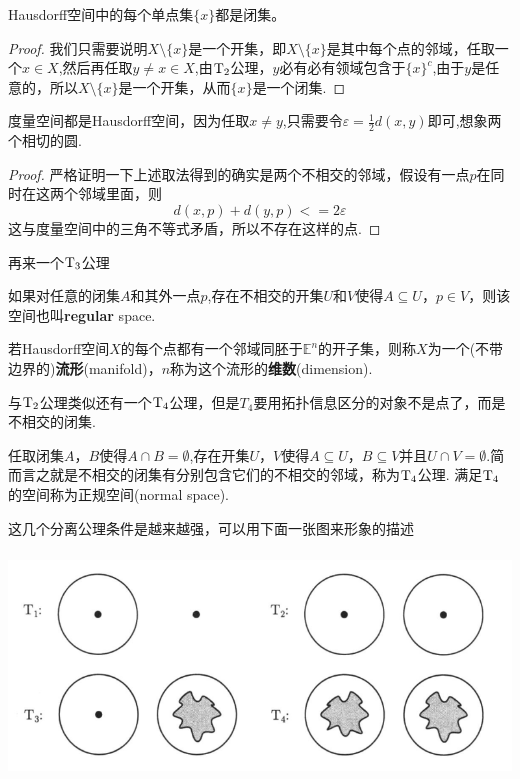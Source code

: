 \begin{proposition}
\rm Hausdorff空间中的每个单点集$\{x\}$都是闭集。
\end{proposition}

\begin{proof}
我们只需要说明$X \setminus \{x\}$是一个开集，即$X \setminus \{x\}$是其中每个点的邻域，任取一个$x \in X$,然后再任取$y \neq x \in X$,由$\rm T_2$公理，$y$必有必有领域包含于$\{x\}^c$,由于$y$是任意的，所以$X \setminus \{x\}$是一个开集，从而$\{x\}$是一个闭集.
\end{proof}

\begin{example}
度量空间都是\rm Hausdorff空间，因为任取$x \neq y$,只需要令$\varepsilon = \frac{1}{2}d(x,y)$即可,想象两个相切的圆.
\end{example}

\begin{proof}
严格证明一下上述取法得到的确实是两个不相交的邻域，假设有一点$p$在同时在这两个邻域里面，则\[d(x,p) + d(y,p) <= 2\varepsilon\]这与度量空间中的三角不等式矛盾，所以不存在这样的点.
\end{proof}

再来一个$\rm T_3$公理

\begin{definition}
如果对任意的闭集$A$和其外一点$p$,存在不相交的开集$U$和$V$使得$A \subseteq U$，$p \in V$，则该空间也叫\rm \textbf{regular} space.
\end{definition}

\begin{definition}
若\rm Hausdorff空间$X$的每个点都有一个邻域同胚于$\mathbb{E}^n$的开子集，则称$X$为一个(不带边界的)\textbf{流形}(manifold)，$n$称为这个流形的\textbf{维数}(\rm dimension).
\end{definition}


与$\rm T_2$公理类似还有一个$\rm T_4$公理，但是$T_4$要用拓扑信息区分的对象不是点了，而是不相交的闭集.

\begin{definition}
任取闭集$A$，$B$使得$A \cap B = \emptyset$,存在开集$U$，$V$使得$A \subseteq U$，$B \subseteq V$并且$U \cap V = \emptyset$.简而言之就是不相交的闭集有分别包含它们的不相交的邻域，称为$\rm T_4$公理. 满足$\rm T_4$的空间称为\textsf{正规空间}(\rm normal space).
\end{definition}

这几个分离公理条件是越来越强，可以用下面一张图来形象的描述


\begin{center}
\includegraphics[width=14cm, height=6cm]{images/separation-axiom.png}
\end{center}


